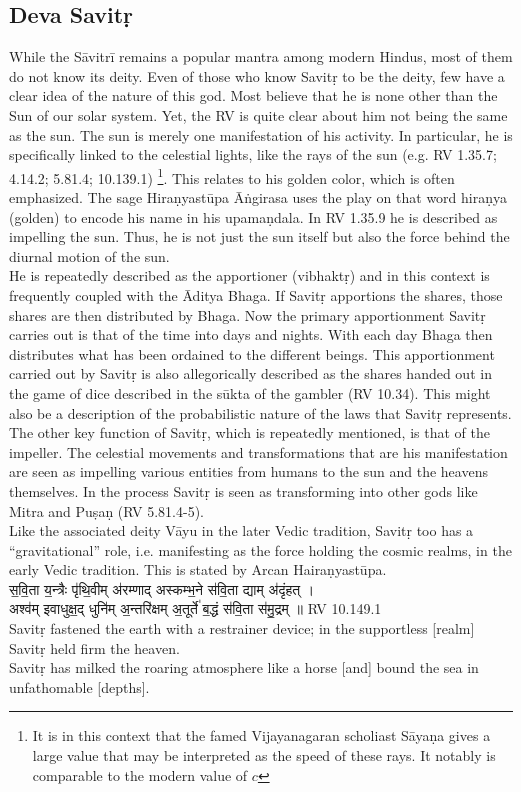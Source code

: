 \documentclass[12pt]{article}
\begin{document}
\subsection{Deva Savitṛ}
While the Sāvitrī remains a popular mantra among modern Hindus, most of them do not know its deity. Even of those who know Savitṛ to be the deity, few have a clear idea of the nature of this god. Most believe that he is none other than the Sun of our solar system. Yet, the RV is quite clear about him not being the same as the sun. The sun is merely one manifestation of his activity. In particular, he is specifically linked to the celestial lights, like the rays of the sun (e.g. RV 1.35.7; 4.14.2; 5.81.4; 10.139.1) \footnote{It is in this context that the famed Vijayanagaran scholiast Sāyaṇa gives a large value that may be interpreted as the speed of these rays. It notably is comparable to the modern value of $c$}. This relates to his golden color, which is often emphasized. The sage Hiraṇyastūpa Āṅgirasa uses the play on that word hiraṇya (golden) to encode his name in his upamaṇdala.  In RV 1.35.9 he is described as impelling the sun. Thus, he is not just the sun itself but also the force behind the diurnal motion of the sun.\\

He is repeatedly described as the apportioner (vibhaktṛ)  and in this context is frequently coupled with the Āditya Bhaga. If Savitṛ apportions the shares, those shares are then distributed by Bhaga. Now the primary apportionment Savitṛ carries out is that of the time into days and nights. With each day Bhaga then distributes what has been ordained to the different beings. This apportionment carried out by Savitṛ is also allegorically described as the shares handed out in the game of dice described in the sūkta of the gambler (RV 10.34). This might also be a description of the probabilistic nature of the laws that Savitṛ represents. The other key function of Savitṛ, which is repeatedly mentioned, is that of the impeller. The celestial movements and transformations that are his manifestation are seen as impelling various entities from humans to the sun and the heavens themselves. In the process Savitṛ is seen as transforming into other gods like Mitra and Puṣaṇ (RV 5.81.4-5).\\

Like the associated deity Vāyu in the later Vedic tradition, Savitṛ too has a ``gravitational'' role, i.e. manifesting as the force holding the cosmic realms, in the early Vedic tradition. This is stated by Arcan Hairaṇyastūpa.\\[8pt] 
{\skt स॒वि॒ता य॒न्त्रैः पृ॑थि॒वीम् अ॑रम्णाद् अस्कम्भ॒ने स॑वि॒ता द्याम् अ॑दृंहत् ।\\
अश्व॑म् इवाधुक्ष॒द् धुनि॑म् अ॒न्तरि॑क्षम् अ॒तूर्ते॑ ब॒द्धं स॑वि॒ता स॑मु॒द्रम् ॥
} RV 10.149.1 \\[8pt]
Savitṛ fastened the earth with a restrainer device; in the supportless [realm] Savitṛ held firm the heaven.\\
Savitṛ has milked the roaring atmosphere like a horse [and] bound the sea in unfathomable [depths].\\
\end{document}
